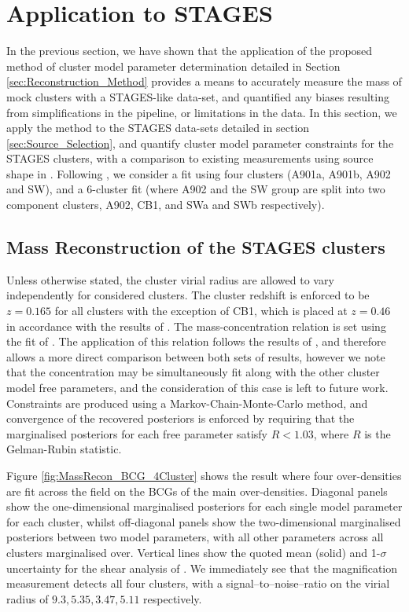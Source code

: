 \documentclass[useAMS,usenatbib,times,letter,amssymb]{mn2e}
\begin{document}
\section{Application to STAGES}\label{sec:ApplicationToSTAGES}

In the previous section, we have shown that the application of the proposed method of cluster model parameter determination detailed in Section \ref{sec:Reconstruction_Method} provides a means to accurately measure the mass of mock clusters with a STAGES-like data-set, and quantified any biases resulting from simplifications in the pipeline, or limitations in the data. In this section, we apply the method to the STAGES data-sets detailed in section \ref{sec:Source_Selection}, and quantify cluster model parameter constraints for the STAGES clusters, with a comparison to existing measurements using source shape in \cite{Heymans:2008p2060}. Following \cite{Heymans:2008p2060}, we consider a fit using four clusters (A901a, A901b, A902 and SW), and a 6-cluster fit (where A902 and the SW group are split into two component clusters, A902, CB1, and SWa and SWb respectively).

\subsection{Mass Reconstruction of the STAGES clusters}

Unless otherwise stated, the cluster virial radius are allowed to vary independently for considered clusters. The cluster redshift is enforced to be $z =0.165$ for all clusters with the exception of CB1, which is placed at $z = 0.46$ in accordance with the results of \cite{Taylor:2004p2808}. The mass-concentration relation is set using the fit of \cite{Dolag:2004p2721}. The application of this relation follows the results of \cite{Heymans:2008p2060}, and therefore allows a more direct comparison between both sets of results, however we note that the concentration may be simultaneously fit along with the other cluster model free parameters, and the consideration of this case is left to future work. Constraints are produced using a Markov-Chain-Monte-Carlo method, and convergence of the recovered posteriors is enforced by requiring that the marginalised posteriors for each free parameter satisfy $R<1.03$, where $R$ is the Gelman-Rubin statistic.

Figure \ref{fig:MassRecon_BCG_4Cluster} shows the result where four over-densities are fit across the field on the BCGs of the main over-densities. Diagonal panels show the one-dimensional marginalised posteriors for each single model parameter for each cluster, whilst off-diagonal panels show the two-dimensional marginalised posteriors between two model parameters, with all other parameters across all clusters marginalised over. Vertical lines show the quoted mean (solid) and 1-$\sigma$ uncertainty for the shear analysis of \cite{Heymans:2008p2060}. We immediately see that the magnification measurement detects all four clusters, with a signal--to--noise--ratio on the virial radius of $9.3,5.35,3.47,5.11$ respectively. 
\end{document}
